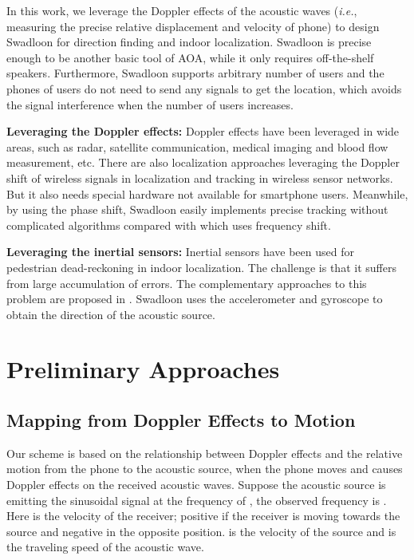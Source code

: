 \documentclass[]{sig-alternate-10pt}
\def\ie{\textit{i.e.}\xspace}
\def \ourprotocol{Swadloon\xspace}
\begin{document}
In this work, we leverage the Doppler effects of the acoustic waves
(\ie, measuring the precise relative displacement and velocity of phone) to
design \ourprotocol for direction finding and indoor localization.
\ourprotocol is precise enough to be another basic tool of AOA, while
it only requires off-the-shelf speakers.  Furthermore, \ourprotocol
supports arbitrary number of users and the phones of users do not
need to send any signals to get the location, which avoids the signal
interference when the number of users increases.

\noindent\textbf{Leveraging the Doppler effects:}
Doppler effects have been leveraged in wide areas, such as radar,
satellite communication, medical imaging and blood flow measurement,
etc. There are also localization approaches leveraging the Doppler
shift of wireless signals in localization
\cite{2008-SenSys-Spinningbeaconsprecise} and tracking
\cite{2007-SenSys-Trackingmobilenodes} in wireless sensor networks. But it also needs special hardware not available for smartphone users.
Meanwhile, by using the phase shift, \ourprotocol 
easily implements precise tracking without complicated algorithms
compared with \cite{ 2007-SenSys-Trackingmobilenodes} which uses
frequency shift.

\noindent\textbf{Leveraging the inertial sensors:} Inertial sensors
have been used for pedestrian dead-reckoning \cite{citeulike:7912602} in indoor
localization.  The challenge is that it suffers from large accumulation
of errors. The complementary
approaches to this problem are proposed in
\cite{Wang:2012:NNW:2307636.2307655, 2012-MOBICOM-Zeezeroeffort}.
\ourprotocol uses the accelerometer and gyroscope to obtain the
direction of the acoustic source.


\section{Preliminary Approaches}
\label{sec:pre}


\subsection{Mapping from Doppler Effects to Motion}
Our scheme is based on the relationship between Doppler effects and the
relative motion from the phone to the acoustic source, when the phone
moves and causes Doppler effects on the received acoustic waves.
Suppose the acoustic source is emitting the sinusoidal signal  at the frequency of , the observed
frequency   \cite{rosen2009encyclopedia} is
.
Here  is the velocity of the receiver;
positive if the receiver is moving towards the source and negative in
the opposite position.   is the velocity of the source and  is the traveling speed of the acoustic wave.
\end{document}
